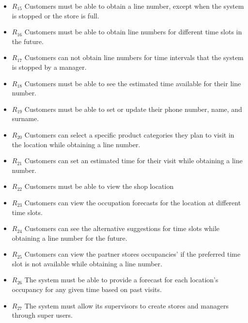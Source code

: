 \begin{itemize}
    \item \textbf{$R_{15}$} Customers must be able to obtain a line number, except when the system is stopped or the store is full.
    \item \textbf{$R_{16}$} Customers must be able to obtain line numbers for different time slots in the future.
    \item \textbf{$R_{17}$} Customers can not obtain line numbers for time intervals that the system is stopped by a manager.
    \item \textbf{$R_{18}$} Customers must be able to see the estimated time available for their line number.
    \item \textbf{$R_{19}$} Customers must be able to set or update their phone number, name, and surname.
    \item \textbf{$R_{20}$} Customers can select a specific product categories they plan to visit in the location while obtaining a line number.
    \item \textbf{$R_{21}$} Customers can set an estimated time for their visit while obtaining a line number.
    \item \textbf{$R_{22}$} Customers must be able to view the shop location
    \item \textbf{$R_{23}$} Customers can view the occupation forecasts for the location at different time slots.
    \item \textbf{$R_{24}$} Customers can see the alternative suggestions for time slots while obtaining a line number for the future.
    \item \textbf{$R_{25}$} Customers can view the partner stores occupancies' if the preferred time slot is not available while obtaining a line number.
    \item \textbf{$R_{26}$} The system must be able to provide a forecast for each location's occupancy for any given time based on past visits.
    \item \textbf{$R_{27}$} The system must allow its supervisors to create stores and managers through super users.
\end{itemize}



